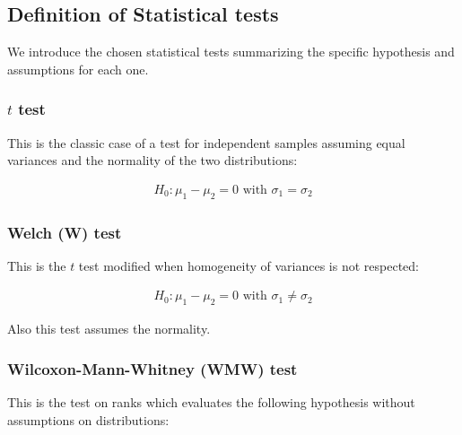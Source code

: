 \documentclass[twocolumn]{article}\usepackage[]{graphicx}\usepackage[]{xcolor}
\begin{document}
\subsection{Definition of Statistical tests}

We introduce the chosen statistical tests summarizing the specific hypothesis and assumptions for each one. 

\subsubsection{$t$ test}

This is the classic case of a test for independent samples assuming equal variances and the normality of the two distributions:
 
\begin{eqnarray*}
H_0: \mu_1 - \mu_2 = 0 \mbox{ with } \sigma_1 = \sigma_2
\end{eqnarray*}


\subsubsection{Welch (W) test}

This is the $t$ test modified when homogeneity of variances is not respected:

\begin{eqnarray*}
H_0: \mu_1 - \mu_2 = 0 \mbox{ with } \sigma_1 \neq \sigma_2
\end{eqnarray*}

Also this test assumes the normality.


\subsubsection{Wilcoxon-Mann-Whitney (WMW) test}

This is the test on ranks which evaluates the following hypothesis without assumptions on distributions:
 
\end{document}
